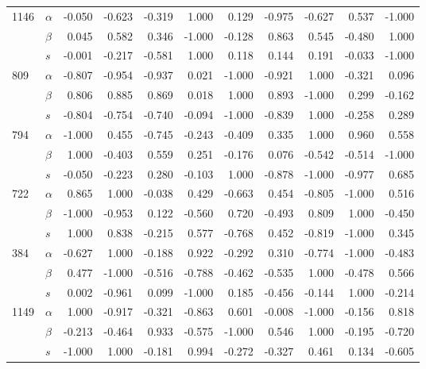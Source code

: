 \begin{longtable}{llrrrrrrrrr}
\cline{1-11}
\multirow{3}{*}{1146} & $\alpha$ & -0.050 & -0.623 & -0.319 &  1.000 &  0.129 & -0.975 & -0.627 &  0.537 & -1.000 \\
     & $\beta$ &  0.045 &  0.582 &  0.346 & -1.000 & -0.128 &  0.863 &  0.545 & -0.480 &  1.000 \\
     & $s$ & -0.001 & -0.217 & -0.581 &  1.000 &  0.118 &  0.144 &  0.191 & -0.033 & -1.000 \\
\cline{1-11}
\multirow{3}{*}{809} & $\alpha$ & -0.807 & -0.954 & -0.937 &  0.021 & -1.000 & -0.921 &  1.000 & -0.321 &  0.096 \\
     & $\beta$ &  0.806 &  0.885 &  0.869 &  0.018 &  1.000 &  0.893 & -1.000 &  0.299 & -0.162 \\
     & $s$ & -0.804 & -0.754 & -0.740 & -0.094 & -1.000 & -0.839 &  1.000 & -0.258 &  0.289 \\
\cline{1-11}
\multirow{3}{*}{794} & $\alpha$ & -1.000 &  0.455 & -0.745 & -0.243 & -0.409 &  0.335 &  1.000 &  0.960 &  0.558 \\
     & $\beta$ &  1.000 & -0.403 &  0.559 &  0.251 & -0.176 &  0.076 & -0.542 & -0.514 & -1.000 \\
     & $s$ & -0.050 & -0.223 &  0.280 & -0.103 &  1.000 & -0.878 & -1.000 & -0.977 &  0.685 \\
\cline{1-11}
\multirow{3}{*}{722} & $\alpha$ &  0.865 &  1.000 & -0.038 &  0.429 & -0.663 &  0.454 & -0.805 & -1.000 &  0.516 \\
     & $\beta$ & -1.000 & -0.953 &  0.122 & -0.560 &  0.720 & -0.493 &  0.809 &  1.000 & -0.450 \\
     & $s$ &  1.000 &  0.838 & -0.215 &  0.577 & -0.768 &  0.452 & -0.819 & -1.000 &  0.345 \\
\cline{1-11}
\multirow{3}{*}{384} & $\alpha$ & -0.627 &  1.000 & -0.188 &  0.922 & -0.292 &  0.310 & -0.774 & -1.000 & -0.483 \\
     & $\beta$ &  0.477 & -1.000 & -0.516 & -0.788 & -0.462 & -0.535 &  1.000 & -0.478 &  0.566 \\
     & $s$ &  0.002 & -0.961 &  0.099 & -1.000 &  0.185 & -0.456 & -0.144 &  1.000 & -0.214 \\
\cline{1-11}
\multirow{3}{*}{1149} & $\alpha$ &  1.000 & -0.917 & -0.321 & -0.863 &  0.601 & -0.008 & -1.000 & -0.156 &  0.818 \\
     & $\beta$ & -0.213 & -0.464 &  0.933 & -0.575 & -1.000 &  0.546 &  1.000 & -0.195 & -0.720 \\
     & $s$ & -1.000 &  1.000 & -0.181 &  0.994 & -0.272 & -0.327 &  0.461 &  0.134 & -0.605 \\

\end{longtable}
